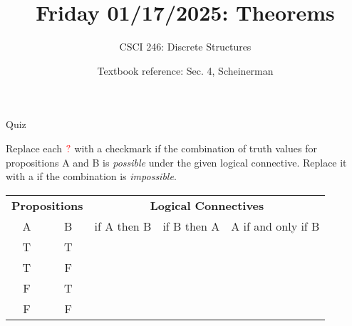 \documentclass[10pt]{beamer}
\begin{document}






\title{Friday 01/17/2025: Theorems}
\author{CSCI 246: Discrete Structures}
\date{Textbook reference: Sec. 4, Scheinerman}


\begin{frame}
    \titlepage 
\end{frame}



\begin{frame}{Quiz}

Replace each $\color{red}{?} \color{black}$ with a checkmark \greencheck if the combination of truth values for propositions A and B is \textit{possible} under the given logical connective.  Replace it with a \redx if the combination is \textit{impossible}.

\begin{table}
\centering
\begin{tabular}{cc|ccc}
\multicolumn{2}{c}{\textbf{Propositions}} & \multicolumn{3}{c}{\textbf{Logical Connectives}} \\
A  & B & if A then B & if B then A & A if and only if B \\
\hline 
T & T & \red{?} & \red{?} & \red{?}\\
T & F &\red{?}  & \red{?} & \red{?} \\
F & T & \red{?} & \red{?} & \red{?} \\
F & F & \red{?} &\red{?}  & \red{?}
\end{tabular}
\end{table}
\vfill \vfill \vfill 
\pause 
{}
\end{frame}
\end{document}
